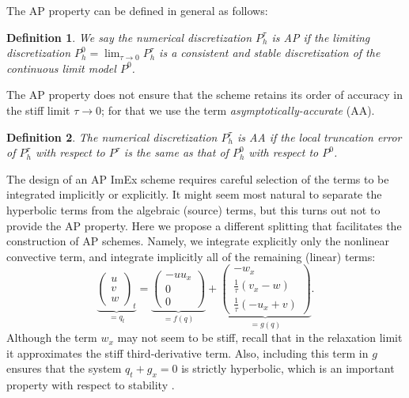 \documentclass{article}
\newtheorem{defn}{Definition}
\begin{document}
The AP property can be defined in general as follows:
\begin{defn}
    We say the numerical discretization $P^\tau_h$ is AP if
    the limiting discretization $P^0_h = \lim_{\tau \to 0}P^\tau_h$ is a
    consistent and stable discretization of the continuous limit model $P^0$.
\end{defn}
The AP property does not ensure that the scheme retains its order of accuracy
in the stiff limit $\tau \to 0$; for that we use the term \emph{asymptotically-accurate} (AA).
\begin{defn}
    The numerical discretization $P^\tau_h$ is AA if the
    local truncation error of $P^\tau_h$ with respect to $P^\tau$ is the same as that of $P^0_h$ with respect to $P^0$.
\end{defn}

The design of an AP ImEx scheme requires careful selection of the terms
to be integrated implicitly or explicitly.  It might seem most natural to
separate the hyperbolic terms from the algebraic (source) terms, but this turns
out not to provide the AP property.
Here we propose a different splitting that facilitates the construction of AP schemes.
Namely, we integrate explicitly only the nonlinear convective term, and integrate
implicitly all of the remaining (linear) terms:
\begin{equation}\label{Eq:KdVH_AP_split}
    \underbrace{\begin{pmatrix}
        u \\
        v \\
        w
    \end{pmatrix}_{t}}_{= q_t}
    =
    \underbrace{\begin{pmatrix}
        -u u_x \\
        0 \\
        0
    \end{pmatrix}}_{= f(q)}
    +
    \underbrace{\begin{pmatrix}
        -w_x \\
        \frac{1}{\tau} (v_x - w) \\
        \frac{1}{\tau} (-u_x + v)
    \end{pmatrix}}_{= g(q)}.
\end{equation}
Although the term $w_x$ may not seem to be stiff, recall that in the relaxation
limit it approximates the stiff third-derivative term. Also, including this term
in $g$ ensures that the system $q_t+g_x=0$ is strictly hyperbolic, which is an
important property with respect to stability \cite{NoeSch2014,RSIMEXFullEuler}.
\end{document}
